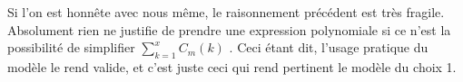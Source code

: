 Si l'on est honnête avec nous même, le raisonnement précédent est très fragile. Absolument rien ne justifie de prendre une expression polynomiale si ce n'est la possibilité de simplifier $\displaystyle \sum_{k = 1}^{x} C_m(k)$ . Ceci étant dit, l'usage pratique du modèle le rend valide, et c'est juste ceci qui rend pertinent le modèle du choix 1.  